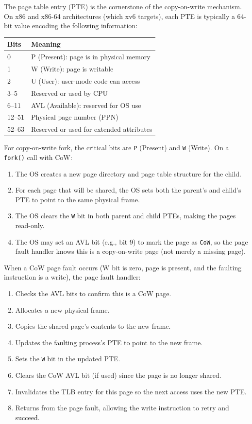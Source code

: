 \documentclass[11pt]{article}
\begin{document}
The page table entry (PTE) is the cornerstone of the copy-on-write mechanism. On x86 and x86-64 architectures (which xv6 targets), each PTE is typically a 64-bit value encoding the following information:

\begin{center}
\begin{tabular}{lp{3.5in}}
\toprule
\textbf{Bits} & \textbf{Meaning} \\
\midrule
0 & P (Present): page is in physical memory \\
1 & W (Write): page is writable \\
2 & U (User): user-mode code can access \\
3--5 & Reserved or used by CPU \\
6--11 & AVL (Available): reserved for OS use \\
12--51 & Physical page number (PPN) \\
52--63 & Reserved or used for extended attributes \\
\bottomrule
\end{tabular}
\end{center}

For copy-on-write fork, the critical bits are \texttt{P} (Present) and \texttt{W} (Write). On a \texttt{fork()} call with CoW:

\begin{enumerate}
    \item The OS creates a new page directory and page table structure for the child.
    \item For each page that will be shared, the OS sets both the parent's and child's PTE to point to the same physical frame.
    \item The OS clears the \texttt{W} bit in both parent and child PTEs, making the pages read-only.
    \item The OS may set an AVL bit (e.g., bit 9) to mark the page as \texttt{CoW}, so the page fault handler knows this is a copy-on-write page (not merely a missing page).
\end{enumerate}

When a CoW page fault occurs (W bit is zero, page is present, and the faulting instruction is a write), the page fault handler:

\begin{enumerate}
    \item Checks the AVL bits to confirm this is a CoW page.
    \item Allocates a new physical frame.
    \item Copies the shared page's contents to the new frame.
    \item Updates the faulting process's PTE to point to the new frame.
    \item Sets the \texttt{W} bit in the updated PTE.
    \item Clears the CoW AVL bit (if used) since the page is no longer shared.
    \item Invalidates the TLB entry for this page so the next access uses the new PTE.
    \item Returns from the page fault, allowing the write instruction to retry and succeed.
\end{enumerate}
\end{document}
